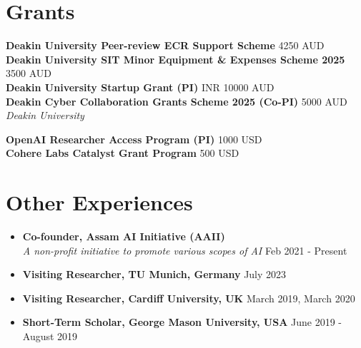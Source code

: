 \documentclass[margin, centered]{res}
\begin{document}
\begin{resume}
\section{Grants}
\textbf{Deakin University Peer-review ECR Support Scheme} \hfill 4250 AUD  \\
\textbf{Deakin University SIT Minor Equipment \& Expenses Scheme 2025} \hfill 3500 AUD  \\
\textbf{Deakin University Startup Grant (PI)} \hfill INR 10000 AUD  \\
\textbf{Deakin Cyber Collaboration Grants Scheme 2025 (Co-PI)} \hfill 5000 AUD  \\
\emph{Deakin University} 

\textbf{OpenAI Researcher Access Program (PI)} \hfill 1000 USD  \\
\textbf{Cohere Labs Catalyst Grant Program} \hfill 500 USD 

\section{Other Experiences}
\begin{itemize}[leftmargin=*]
\item[] \textbf{Co-founder,  Assam AI Initiative (AAII)} \\
\emph{A non-profit initiative to promote various scopes of AI} \hfill Feb 2021 - Present
\item[] \textbf{Visiting Researcher, TU Munich, Germany} \hfill July 2023
\item[] \textbf{Visiting Researcher, Cardiff University, UK} \hfill March 2019,  March 2020
\item[] \textbf{Short-Term Scholar, George Mason University, USA} \hfill June 2019 - August 2019
\end{itemize}


\end{resume}
\end{document}
